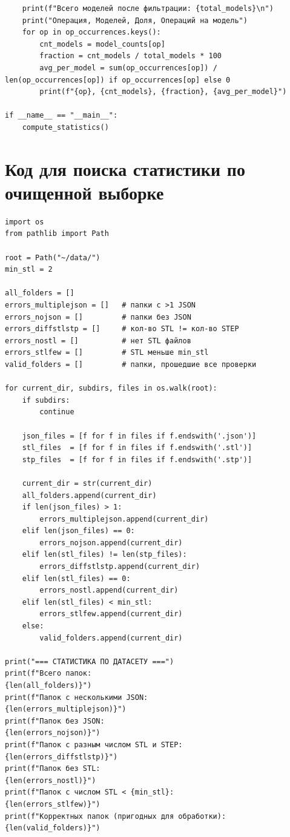 \begin{verbatim}
    print(f"Всего моделей после фильтрации: {total_models}\n")
    print("Операция, Моделей, Доля, Операций на модель")
    for op in op_occurrences.keys():
        cnt_models = model_counts[op]
        fraction = cnt_models / total_models * 100
        avg_per_model = sum(op_occurrences[op]) / len(op_occurrences[op]) if op_occurrences[op] else 0
        print(f"{op}, {cnt_models}, {fraction}, {avg_per_model}")

if __name__ == "__main__":
    compute_statistics()
\end{verbatim}



\section{Код для поиска статистики по очищенной выборке}

\begin{verbatim}
import os
from pathlib import Path

root = Path("~/data/")
min_stl = 2

all_folders = []
errors_multiplejson = []   # папки с >1 JSON
errors_nojson = []         # папки без JSON
errors_diffstlstp = []     # кол-во STL != кол-во STEP
errors_nostl = []          # нет STL файлов
errors_stlfew = []         # STL меньше min_stl
valid_folders = []         # папки, прошедшие все проверки

for current_dir, subdirs, files in os.walk(root):
    if subdirs:
        continue

    json_files = [f for f in files if f.endswith('.json')]
    stl_files  = [f for f in files if f.endswith('.stl')]
    stp_files  = [f for f in files if f.endswith('.stp')]

    current_dir = str(current_dir)
    all_folders.append(current_dir)
    if len(json_files) > 1:
        errors_multiplejson.append(current_dir)
    elif len(json_files) == 0:
        errors_nojson.append(current_dir)
    elif len(stl_files) != len(stp_files):
        errors_diffstlstp.append(current_dir)
    elif len(stl_files) == 0:
        errors_nostl.append(current_dir)
    elif len(stl_files) < min_stl:
        errors_stlfew.append(current_dir)
    else:
        valid_folders.append(current_dir)

print("=== СТАТИСТИКА ПО ДАТАСЕТУ ===")
print(f"Всего папок:                               {len(all_folders)}")
print(f"Папок с несколькими JSON:                   {len(errors_multiplejson)}")
print(f"Папок без JSON:                             {len(errors_nojson)}")
print(f"Папок с разным числом STL и STEP:           {len(errors_diffstlstp)}")
print(f"Папок без STL:                              {len(errors_nostl)}")
print(f"Папок с числом STL < {min_stl}:                     {len(errors_stlfew)}")
print(f"Корректных папок (пригодных для обработки): {len(valid_folders)}")
\end{verbatim}

